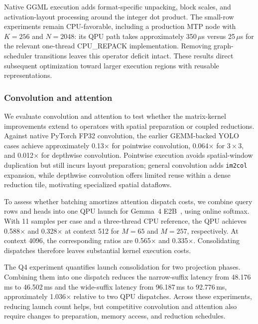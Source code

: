 \documentclass[sigplan,screen,review]{acmart}
\begin{document}
Native GGML execution adds format-specific unpacking, block scales, and activation-layout processing around the integer dot product. The small-row experiments remain CPU-favorable, including a production MTP node with $K=256$ and $N=2048$: its QPU path takes approximately 350\,$\mu$s versus 25\,$\mu$s for the relevant one-thread CPU\_REPACK implementation. Removing graph-scheduler transitions leaves this operator deficit intact. These results direct subsequent optimization toward larger execution regions with reusable representations.

\subsubsection{Convolution and attention}

We evaluate convolution and attention to test whether the matrix-kernel improvements extend to operators with spatial preparation or coupled reductions. Against native PyTorch FP32 convolution, the earlier GEMM-backed YOLO cases achieve approximately 0.13$\times$ for pointwise convolution, 0.064$\times$ for $3\times3$, and 0.012$\times$ for depthwise convolution. Pointwise execution avoids spatial-window duplication but still incurs layout preparation; general convolution adds \texttt{im2col} expansion, while depthwise convolution offers limited reuse within a dense reduction tile, motivating specialized spatial dataflows. %

To assess whether batching amortizes attention dispatch costs, we combine query rows and heads into one QPU launch for Gemma~4 E2B~\cite{gemma4}, using online softmax. With 11 samples per case and a three-thread CPU reference, the QPU achieves 0.588$\times$ and 0.328$\times$ at context 512 for $M=65$ and $M=257$, respectively. At context 4096, the corresponding ratios are 0.565$\times$ and 0.335$\times$. Consolidating dispatches therefore leaves substantial kernel execution costs.

The Q4 experiment quantifies launch consolidation for two projection phases. Combining them into one dispatch reduces the narrow-suffix latency from 48.176\,ms to 46.502\,ms and the wide-suffix latency from 96.187\,ms to 92.776\,ms, approximately 1.036$\times$ relative to two QPU dispatches. Across these experiments, reducing launch count helps, but competitive convolution and attention also require changes to preparation, memory access, and reduction schedules.
\end{document}
